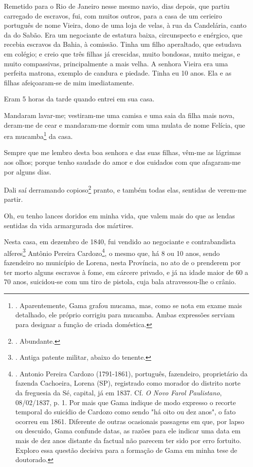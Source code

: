 Remetido para o Rio de Janeiro nesse mesmo navio, dias depois, que
partiu carregado de escravos, fui, com muitos outros, para a casa de um
cerieiro português de nome Vieira, dono de uma loja de velas, à rua da
Candelária, canto da do Sabão. Era um negociante de estatura baixa,
circunspecto e enérgico, que recebia escravos da Bahia, à comissão.
Tinha um filho aperaltado, que estudava em colégio; e creio que três
filhas já crescidas, muito bondosas, muito meigas, e muito compassivas,
principalmente a mais velha. A senhora Vieira era uma perfeita matrona,
exemplo de candura e piedade. Tinha eu 10 anos. Ela e as filhas
afeiçoaram-se de mim imediatamente.

Eram 5 horas da tarde quando entrei em sua casa.

Mandaram lavar-me; vestiram-me uma camisa e uma saia da filha mais nova,
deram-me de cear e mandaram-me dormir com uma mulata de nome Felícia,
que era mucamba\footnote{. Aparentemente, Gama grafou mucama, mas, como
  se nota em exame mais detalhado, ele próprio corrigiu para mucamba.
  Ambas expressões serviam para designar a função de criada doméstica.}
da casa.

Sempre que me lembro desta boa senhora e das suas filhas, vêm-me as
lágrimas aos olhos; porque tenho saudade do amor e dos cuidados com que
afagaram-me por alguns dias.

Dali saí derramando copioso\footnote{. Abundante.} pranto, e também
todas elas, sentidas de verem-me partir.

Oh, eu tenho lances doridos em minha vida, que valem mais do que as
lendas sentidas da vida armargurada dos mártires.

Nesta casa, em dezembro de 1840, fui vendido ao negociante e
contrabandista alferes\footnote{. Antiga patente militar, abaixo do
  tenente.} Antônio Pereira Cardozo\footnote{. Antonio Pereira Cardozo
  (1791-1861), português, fazendeiro, proprietário da fazenda Cachoeira,
  Lorena (SP), registrado como morador do distrito norte da freguesia da
  Sé, capital, já em 1837. Cf. \emph{O Novo Farol Paulistano},
  08/02/1837, p. 1. Por mais que Gama indique de modo expresso o recorte
  temporal do suicídio de Cardozo como sendo "há oito ou dez anos", o
  fato ocorreu em 1861. Diferente de outras ocasionais passagens em que,
  por lapso ou descuido, Gama confunde datas, as razões para ele indicar
  uma data em mais de dez anos distante da factual não parecem ter sido
  por erro fortuito. Exploro essa questão decisiva para a formação de
  Gama em minha tese de doutorado.}, o mesmo que, há 8 ou 10 anos, sendo
fazendeiro no município de Lorena, nesta Província, no ato de o
prenderem por ter morto alguns escravos à fome, em cárcere privado, e já
na idade maior de 60 a 70 anos, suicidou-se com um tiro de pistola, cuja
bala atravessou-lhe o crânio.

